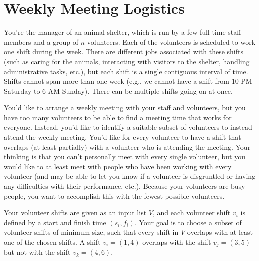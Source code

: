 \documentclass[11pt,fleqn]{exam}
\begin{document}
\section{Weekly Meeting Logistics}

You're the manager of an animal shelter, which is run by a few full-time staff members and a group of $n$ volunteers. Each of the volunteers is scheduled to work one shift during the week. There are different jobs associated with these shifts (such as caring for the animals, interacting with visitors to the shelter, handling administrative tasks, etc.), but each shift is a single contiguous interval of time. Shifts cannot span more than one week (e.g., we cannot have a shift from 10 PM Saturday to 6 AM Sunday). There can be multiple shifts going on at once.

You'd like to arrange a weekly meeting with your staff and volunteers, but you have too many volunteers to be able to find a meeting time that works for everyone. Instead, you'd like to identify a suitable subset of volunteers to instead attend the weekly meeting. You'd like for every volunteer to have a shift that overlaps (at least partially) with a volunteer who is attending the meeting. Your thinking is that you can't personally meet with every single volunteer, but you would like to at least meet with people who have been working with every volunteer (and may be able to let you know if a volunteer is disgruntled or having any difficulties with their performance, etc.). Because your volunteers are busy people, you want to accomplish this with the fewest possible volunteers.

Your volunteer shifts are given as an input list $V$, and each volunteer shift $v_i$ is defined by a start and finish time $(s_i, f_i)$. Your goal is to choose a subset of volunteer shifts of minimum size, such that every shift in $V$ overlaps with at least one of the chosen shifts. A shift $v_i=(1,4)$ overlaps with the shift $v_j=(3,5)$ but not with the shift $v_k=(4,6)$. 
\end{document}
